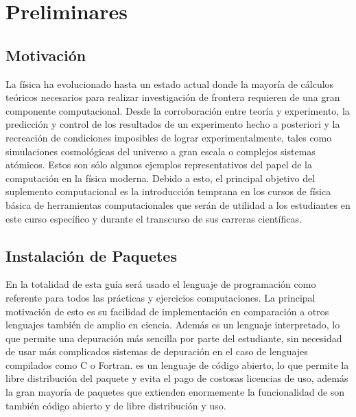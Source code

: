 \chapter{Preliminares}
\label{cha:prem}


\section{Motivación}
\label{sec:motiv}


La física ha evolucionado hasta un estado actual donde la mayoría de 
cálculos teóricos necesarios para realizar investigación de frontera 
requieren de una gran componente computacional. Desde la corroboración 
entre teoría y experimento, la predicción y control de los resultados de 
un experimento hecho a posteriori y la recreación de condiciones imposibles 
de lograr experimentalmente, tales como simulaciones cosmológicas del 
universo a gran escala o complejos sistemas atómicos. Estos son sólo 
algunos ejemplos representativos del papel de la computación en la física 
moderna. Debido a esto, el principal objetivo del suplemento computacional 
es la introducción temprana en los cursos de física básica de herramientas 
computacionales que serán de utilidad a los estudiantes en este curso 
específico y durante el transcurso de sus carreras científicas.






\section{Instalación de Paquetes}
\label{sec:install}


En la totalidad de esta guía será usado el lenguaje de programación \python
como referente para todos las prácticas y ejercicios computaciones. La 
principal motivación de esto es su facilidad de implementación en 
comparación a otros lenguajes también de amplio en ciencia. Además es un 
lenguaje interpretado, lo que permite una depuración más sencilla por 
parte del estudiante, sin necesidad de usar más complicados sistemas de 
depuración en el caso de lenguajes compilados como C o Fortran. \python es 
un lenguaje de código abierto, lo que permite la libre distribución del 
paquete y evita el pago de costosas licencias de uso, además la gran 
mayoría de paquetes que extienden enormemente la funcionalidad de \python 
son también código abierto y de libre distribución y uso.


